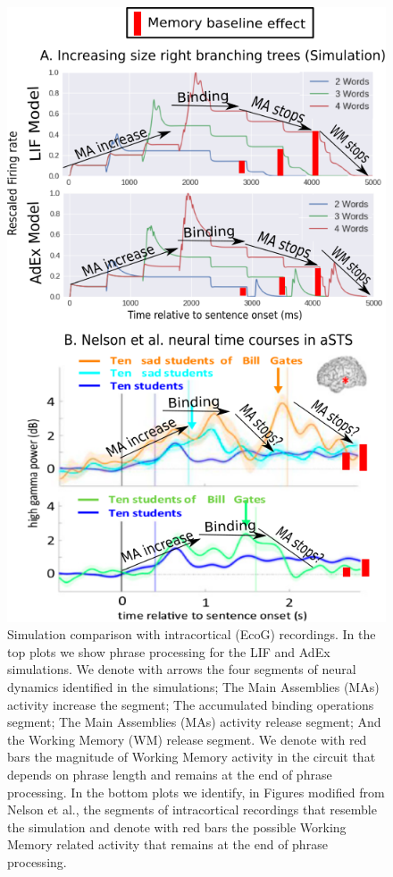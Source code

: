 \documentclass[10pt]{article}
\begin{document}
\begin{figure}[h!]
  \begin{center}
    \includegraphics[width=0.70\columnwidth]{figures/ecog_comparison_1.png}
    \caption{{Simulation comparison with intracortical (EcoG)
        recordings.
        In the top plots we show phrase processing for the LIF and AdEx simulations.
        We denote with arrows the four segments of neural dynamics identified in the simulations; The Main Assemblies (MAs) activity increase the segment; The accumulated binding operations segment; The Main Assemblies (MAs) activity release segment; And the Working Memory (WM) release segment.
        We denote with red bars the magnitude of Working Memory activity in the circuit that depends on phrase length and remains at the end of phrase processing.
        In the bottom plots we identify, in Figures modified from Nelson et al., the segments of intracortical recordings that resemble the simulation and denote with red bars the possible Working Memory related activity that remains at the end of phrase processing.
        {\label{fig:ecog-1}}%
      }}
  \end{center}
\end{figure}
\end{document}

